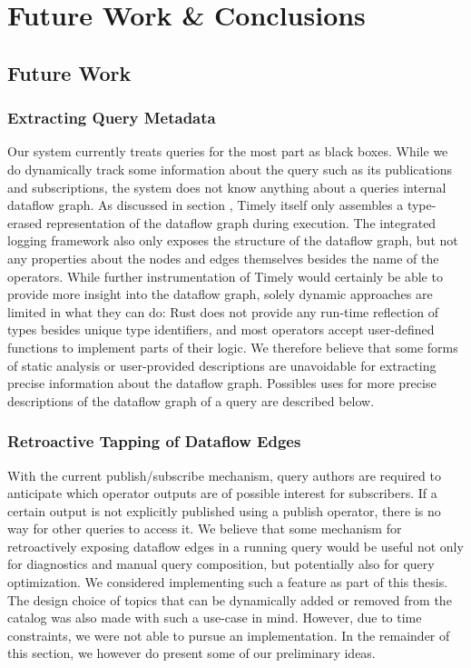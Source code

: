 \chapter{Future Work \& Conclusions} \label{ch:conclusions}

\section{Future Work}



\subsection{Extracting Query Metadata}

Our system currently treats queries for the most part as black boxes. While we
do dynamically track some information about the query such as its publications
and subscriptions, the system does not know anything about a queries internal
dataflow graph. As discussed in section , Timely
itself only assembles a type-erased representation of the dataflow graph
during execution. The integrated logging framework also only exposes the
structure of the dataflow graph, but not any properties about the nodes and
edges themselves besides the name of the operators. While further instrumentation
of Timely would certainly be able to provide more insight into the dataflow
graph, solely dynamic approaches are limited in what they can do:
Rust does not provide any run-time reflection of types besides unique type
identifiers, and most operators accept user-defined functions to implement
parts of their logic. We therefore believe that some forms of static analysis
or user-provided descriptions are unavoidable for extracting precise information
about the dataflow graph. Possibles uses for more precise descriptions of the
dataflow graph of a query are described below.

\subsection{Retroactive Tapping of Dataflow Edges}

With the current publish/subscribe mechanism, query authors are required to
anticipate which operator outputs are of possible interest for subscribers. If
a certain output is not explicitly published using a publish operator, there
is no way for other queries to access it. We believe that some mechanism for
retroactively exposing dataflow edges in a running query would be useful not
only for diagnostics and manual query composition, but potentially also
for query optimization. We considered implementing such a feature as part
of this thesis. The design choice of topics that can be dynamically added
or removed from the catalog was also made with such a use-case in mind.
However, due to time constraints, we were not able to pursue an implementation.
In the remainder of this section, we however do present some of our
preliminary ideas.

